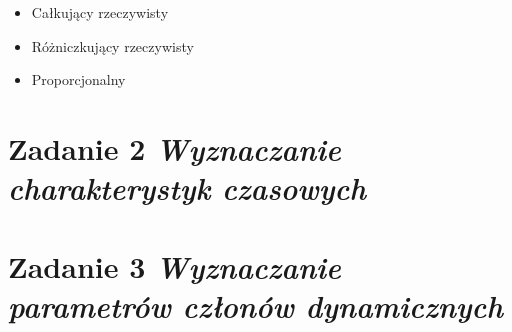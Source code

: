 \documentclass[a4paper,10pt]{article}
\begin{document}
\begin{itemize}
\begin{itemize}
\end{itemize}

\item Całkujący rzeczywisty

\item Różniczkujący rzeczywisty

\item Proporcjonalny

\end{itemize}

\section{Zadanie 2 \textit{\small Wyznaczanie charakterystyk czasowych}}\label{sec:zad2}
\section{Zadanie 3 \textit{\small Wyznaczanie parametrów członów dynamicznych}}\label{sec:zad3}
\end{document}
